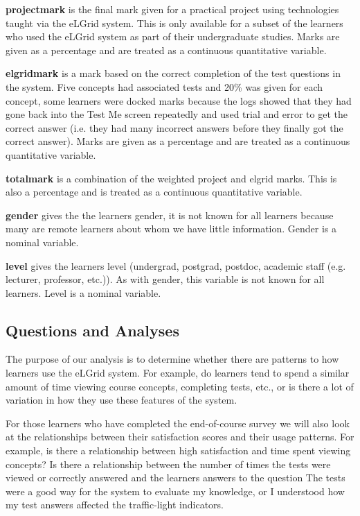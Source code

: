 \documentclass[12pt,twoside]{article}
\begin{document}
\textbf{projectmark} is the final mark given for a practical project
using technologies taught via the eLGrid system. This is only available
for a subset of the learners who used the eLGrid system as part of
their undergraduate studies. Marks are given as a percentage and are
treated as a continuous quantitative variable. 

\textbf{elgridmark} is a mark based on the correct completion of the
test questions in the system. Five concepts had associated tests and
20\% was given for each concept, some learners were docked marks
because the logs showed that they had gone back into the
{\textquotedbl}Test Me{\textquotedbl} screen repeatedly and used trial
and error to get the correct answer (i.e. they had many incorrect
answers before they finally got the correct answer). Marks are given as
a percentage and are treated as a continuous quantitative variable. 

\textbf{totalmark} is a combination of the weighted project and elgrid
marks. This is also a percentage and is treated as a continuous
quantitative variable. 

\textbf{gender} gives the the learner{\textquotesingle}s gender, it is
not known for all learners because many are remote learners about whom
we have little information. Gender is a nominal variable. 

\textbf{level} gives the learner{\textquotesingle}s level (undergrad,
postgrad, postdoc, academic staff (e.g. lecturer, professor, etc.)). As
with gender, this variable is not known for all learners. Level is a
nominal variable. 

\subsection{Questions and Analyses }
The purpose of our analysis is to determine whether there are patterns
to how learners use the eLGrid system. For example, do learners tend to
spend a similar amount of time viewing course concepts, completing
tests, etc., or is there a lot of variation in how they use these
features of the system. 

For those learners who have completed the end{}-of{}-course survey we
will also look at the relationships between their satisfaction scores
and their usage patterns. For example, is there a relationship between
high satisfaction and time spent viewing concepts? Is there a
relationship between the number of times the tests were viewed or
correctly answered and the learners{\textquotesingle} answers to the
question {\textquotedbl}The tests were a good way for the system to
evaluate my knowledge{\textquotedbl}, or {\textquotedbl}I understood
how my test answers affected the traffic{}-light
indicators{\textquotedbl}. 
\end{document}
